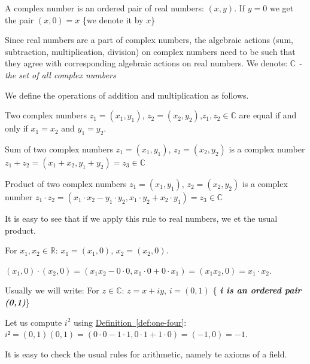 \documentclass[12pt]{article}
\providecommand{\emphic}[2]{}
\renewcommand{\emphic}[2]{\textcolor{blue25emph}{%
      \textbf{\emph{#1}}}\index{#2}}
\providecommand{\emphi}[1]{}%
\renewcommand{\emphi}[1]{\emphic{#1}{#1}}
\providecommand{\emphw}[1]{}%
\renewcommand{\emphw}[1]{{\textcolor{almostblack}{\emph{#1}}}}%
\newcommand{\HLink}[2]{\hyperref[#2]{#1~\ref*{#2}}}
\providecommand{\deflab}[1]{}
\renewcommand{\deflab}[1]{\label{def:#1}}
\newcommand{\defref}[1]{\HLink{Definition}{def:#1}}
\begin{document}


\begin{definition}\deflab{one-one}
    A complex number is an ordered pair of real numbers: $(x,y)$. If $y=0$ we get the pair $(x,0)=x$ \{we denote it by \emphi{$x$}\}
\end{definition}

Since real numbers are a part of complex numbers, the algebraic actions (sum, subtraction, multiplication, division) on complex numbers need to be such that they agree with corresponding algebraic actions on real numbers. 
We denote:
\emphw{$\mathbb{C}$ - the set of all complex numbers}

We define the operations of addition and multiplication as follows.
\begin{definition}
    Two complex numbers $z_1=(x_1,y_1)$, $z_2=(x_2,y_2)$,$z_1,z_2\in \mathbb{C}$ are equal if and only if $x_1=x_2$ and $y_1=y_2$.
\end{definition}

\begin{definition}\deflab{onetwo}
    Sum of two complex numbers $z_1=(x_1,y_1)$, $z_2=(x_2,y_2)$ is a complex number $z_1+z_2 = (x_1+x_2,y_1+y_2)=z_3\in\mathbb{C}$
\end{definition}
 \begin{definition}\deflab{one-four}
   Product of two complex numbers $z_1 = (x_1,y_1)$, $z_2= (x_2,y_2)$ is a complex number $z_1\cdot z_2=(x_1\cdot x_2-y_1\cdot y_2,x_1\cdot y_2 + x_2 \cdot y_1) = z_3 \in \mathbb{C}$
 \end{definition}
 
 It is easy to see that if we apply this rule to real numbers, we et the usual product.
 \begin{remark}
   For $x_1,x_2\in \mathbb{R}$: $x_1 = (x_1,0)$, $x_2 = (x_2,0)$.

   $(x_1,0)\cdot (x_2,0)= (x_1x_2-0\cdot 0, x_1\cdot 0 + 0\cdot x_1)= (x_1x_2,0) = x_1\cdot x_2$.
 \end{remark}

 Usually we will write:
 For $z\in \mathbb{C}$: $z=x+iy$, $i=(0,1)$ \{\emphi{i is an ordered pair (0,1)}\}

 Let us compute $i^2$ using \defref{one-four}:
$i² = (0,1)(0,1) = (0\cdot 0-1\cdot 1,0\cdot 1+1\cdot 0)=(-1,0)=-1$.

It is easy to check the usual rules for arithmetic, namely te axioms of a field.
\end{document}
